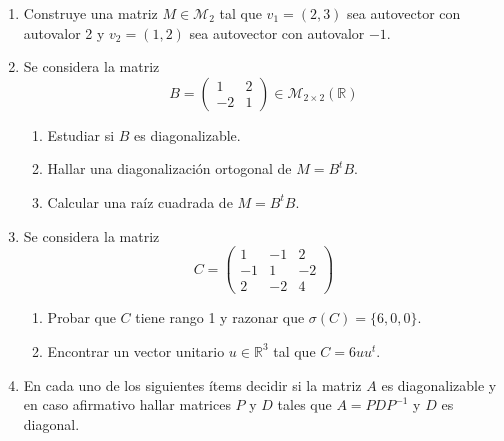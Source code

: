 \documentclass[12pt,letterpaper]{article}
\begin{document}
\begin{enumerate}
\begin{enumerate}
  \end{enumerate}
  \item Construye una matriz $M \in \mathcal{M}_2$ tal que $v_1 = (2, 3)$ sea autovector con autovalor 2 y $v_2 =
(1, 2)$ sea autovector con autovalor $-1$.
  \item Se considera la matriz
  $$
  B=\begin{pmatrix}
  1 & 2\\
  -2 & 1
  \end{pmatrix} \in \mathcal{M}_{2\times2}(\mathbb{R}) 
  $$
  \begin{enumerate}
    \item Estudiar si $B$ es diagonalizable.
    \item Hallar una diagonalización ortogonal de $M = B^tB$.
    \item Calcular una raíz cuadrada de $M = B^tB$.
  \end{enumerate}
  \item Se considera la matriz
  $$
  C=\begin{pmatrix}
  1 & -1 & 2\\
  -1 & 1 & -2\\
  2 & -2 & 4
  \end{pmatrix}
  $$
  \begin{enumerate}
    \item Probar que $C$ tiene rango 1 y razonar que $\sigma(C) = \{6, 0, 0\}$.
    \item Encontrar un vector unitario $u \in \mathbb{R}^3$ tal que $C= 6uu^t$.  
  \end{enumerate}
  \item En cada uno de los siguientes ítems decidir si la matriz $A$ es diagonalizable y en caso afirmativo hallar matrices $P$ y $D$ tales que $A = PDP^{-1}$ y $D$ es diagonal.
  \begin{multicols}{3}
\end{multicols}
\end{enumerate}
\end{document}

